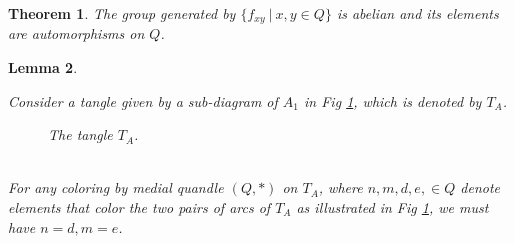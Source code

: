 \documentclass[10pt,a4paper]{amsart}
\newtheorem{theorem}{Theorem}
\newtheorem{lemma}[theorem]{Lemma}
\begin{document}
\begin{theorem}
    
 \label{corofmapsareautomorphism}
The group generated by $\{f_{xy}~|~x,y\in Q\}$ is abelian and its elements are automorphisms on $Q$.
\end{theorem}

\begin{lemma} \label{lemma1}

Consider a tangle given by a sub-diagram of $A_1$ in Fig \ref{TA}, which is denoted by $T_A$.
       \begin{figure}[h]  \centering        \caption{The tangle $T_A$.} \label{TA}
          \end{figure}
\\For any coloring by medial quandle $(Q,*)$ on $T_A$, where $n,m,d,e,\in Q$ denote elements that color the two pairs of arcs of $T_A$ as illustrated in Fig \ref{TA}, we must have $n=d,m=e$. \end{lemma}
\end{document}
